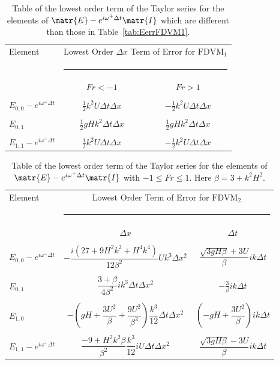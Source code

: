 \begin{table}
	\begin{tabular}{l  c  c}
	\hline
		Element &\multicolumn{2}{c}{Lowest Order $\Delta x$ Term of Error for $\text{FDVM}_1$}\\
		&  \multicolumn{2}{l}{\rule{0.7\textwidth}{0.4pt}} \\
		& $Fr < -1$&$ Fr> 1$\\
		\hline & \\
		$E_{0,0} -  e^{i \omega^+ \Delta t} $& $ \frac{1}{2} k^2 U \Delta t \Delta x$ &  $- \frac{1}{2} k^2 U \Delta t \Delta x$  \\  &  \\
		$E_{0,1}$& $\frac{1}{2}gHk^2 \Delta t \Delta x $ & $\frac{1}{2}gHk^2 \Delta t \Delta x $   \\  &  \\
		$E_{1,1} -  e^{i \omega^+ \Delta t}$& $ \frac{1}{2} k^2 U \Delta t \Delta x$ & $- \frac{1}{2} k^2 U \Delta t \Delta x$   \\ 
	\hline
	\end{tabular}
	\caption{Table of the lowest order term of the Taylor series for the elements of $\matr{E} - e^{i \omega^+ \Delta t} \matr{I}$ which are different than those in Table~\ref{tab:EerrFDVM1}. }
	\label{tab:EerrFDVM1super} 
\end{table}

\begin{table}
	\begin{tabular}{l  c c}
	\hline
		Element & \multicolumn{2}{c}{Lowest Order Term of Error for $\text{FDVM}_2$}\\
		&  \multicolumn{2}{l}{\rule{0.7\textwidth}{0.4pt}} \\
		& $\Delta x$&$\Delta t$\\
		\hline && \\
		$E_{0,0} -  e^{i \omega^+ \Delta t} $& $ -\dfrac{i \left(27 + 9H^2k^2 + H^4k^4\right)}{12\beta^2} U k^3 \Delta x^2$ & $\dfrac{\sqrt{3gH \beta} + 3U}{\beta} ik \Delta t$ \\ & & \\
		$E_{0,1}$& $ \dfrac{3 + \beta}{4 \beta^2}i k^3\Delta  t\Delta x^2$ &  $ - \frac{3}{\beta} ik\Delta t$ \\ & & \\
		$E_{1,0}$& $ -\left(gH + \dfrac{3U^2}{\beta} + \dfrac{9U^2}{\beta^2}\right)  \dfrac{k^3}{12}\Delta t\Delta x^2$ &  $ \left(-gH + \dfrac{3U^2}{\beta}\right)ik \Delta t$ \\ & & \\
		$E_{1,1} -  e^{i \omega^+ \Delta t}$& $ \dfrac{-9 + H^2k^2\beta}{\beta^2} \dfrac{k^3}{12} i U \Delta t\Delta x^2$ & $\dfrac{\sqrt{3gH \beta} - 3U}{\beta} ik \Delta t$ \\
		\hline 
	\end{tabular}
	\caption{Table of the lowest order term of the Taylor series for the elements of $\matr{E} - e^{i \omega^+ \Delta t} \matr{I}$ with $ -1 \le Fr \le 1$. Here $\beta = 3 + k^2 H^2$.}
	\label{tab:EerrFDVM2} 
\end{table}

